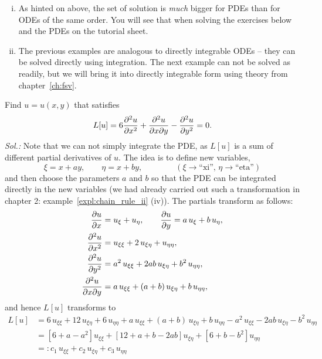 \begin{remark}
\begin{enumerate}[(i)]
	\item As hinted on above, the set of solution is \emph{much} bigger for PDEs than for ODEs of the same order. You will see that when solving the exercises below and the PDEs on the tutorial sheet.
	\item The previous examples are analogous to directly integrable ODEs -- they can be solved directly using integration. The next example can not be solved as readily, but we will bring it into directly integrable form using theory from chapter~\ref{ch:fsv}.
\end{enumerate}
\end{remark}

\begin{example}
Find $u=u(x,y)$ that satisfies
\[ L[u] = 6\displaystyle{\frac{\partial^2 u}{\partial x^2}} + \displaystyle{\frac{\partial^2 u}{\partial{x}\partial{y}}} - \displaystyle{\frac{\partial^2 u}{\partial y^2}} = 0. \]
	{\it Sol.:}
Note that we can not simply integrate the PDE, as $L[u]$ is a sum of different partial derivatives of $u$. The idea is to define new variables,
\[ \xi = x+ay,\qquad \eta=x+by, \qquad \qquad
(\xi\rightarrow\text{``xi''},\,\eta\rightarrow\text{``eta''})\]
and then choose the parameters $a$ and $b$ so that the PDE can be integrated directly in the new variables (we had already carried out such a transformation in chapter 2: example~\ref{expl:chain_rule_ii} (iv)). The partials transform as follows:
\begin{equation*}
\begin{split}
\displaystyle{\frac{\partial u}{\partial x}} &= u_\xi+u_\eta, \qquad
\displaystyle{\frac{\partial u}{\partial y}} = a\,u_\xi+b\,u_\eta, \\
\displaystyle{\frac{\partial^2 u}{\partial x^2}} &= u_{\xi\xi}+2\,u_{\xi\eta}+u_{\eta\eta}, \\
\displaystyle{\frac{\partial^2 u}{\partial y^2}} &= a^2\,u_{\xi\xi}+2ab\,u_{\xi\eta}+b^2\,u_{\eta\eta}, \\
\displaystyle{\frac{\partial^2 u}{\partial{x}\partial{y}}} &= a\,u_{\xi\xi}+(a+b)\,u_{\xi\eta}+b\,u_{\eta\eta}, 
\end{split}
\end{equation*}
and hence $L[u]$ transforms to 
\begin{equation*}
\begin{split}
L[u] &= 6\,u_{\xi\xi}+12\,u_{\xi\eta}+6\,u_{\eta\eta}
+ a\,u_{\xi\xi}+(a+b)\,u_{\xi\eta}+b\,u_{\eta\eta}
- a^2\,u_{\xi\xi}-2ab\,u_{\xi\eta}-b^2\,u_{\eta\eta} \\
&= \left[ 6+a-a^2 \right]u_{\xi\xi} + \left[ 12+a+b-2ab \right]u_{\xi\eta}
+\left[ 6+b-b^2 \right]u_{\eta\eta} \\
&=: c_1\,u_{\xi\xi} + c_2\,u_{\xi\eta} + c_3\,u_{\eta\eta}

\end{split}
\end{equation*}
\end{example}
